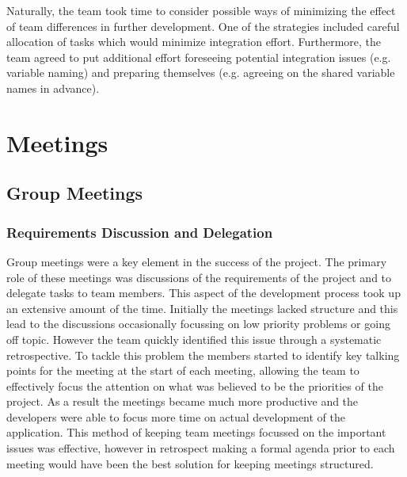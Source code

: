 \documentclass{l3proj}
\begin{document}
Naturally, the team took time to consider possible ways of minimizing the effect of team differences in further development. One of the strategies included careful allocation of tasks which would minimize integration effort. Furthermore, the team agreed to put additional effort foreseeing potential integration issues (e.g. variable naming) and preparing themselves (e.g. agreeing on the shared variable names in advance).

\section{Meetings}
\label{sec:meetings}

\subsection{Group Meetings}
\subsubsection{Requirements Discussion and Delegation}
Group meetings were a key element in the success of the project. The primary role of these meetings was discussions of the requirements of the project and to delegate tasks to team members. This aspect of the development process took up an extensive amount of the time. Initially the meetings lacked structure and this lead to the discussions occasionally focussing on low priority problems or going off topic. However the team quickly identified this issue through a systematic retrospective. To tackle this problem the members started to identify key talking points for the meeting at the start of each meeting, allowing the team to effectively focus the attention on what was believed to be the priorities of the project. As a result the meetings became much more productive and the developers were able to focus more time on actual development of the application. This method of keeping team meetings focussed on the important issues was effective, however in retrospect making a formal agenda prior to each meeting would have been the best solution for keeping meetings structured.
\end{document}
